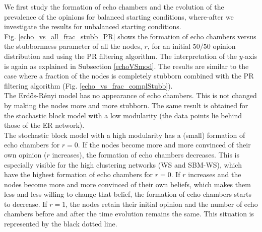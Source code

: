 \documentclass[11 pt , letterpaper , twoside , openright]{book}
\begin{document}
\newline
We first study the formation of echo chambers and the evolution of the prevalence of the opinions for balanced starting conditions, where-after we investigate the results for unbalanced starting conditions.\\
\newline
Fig. \ref{echo_vs_all_frac_stubb_PR} shows the formation of echo chambers versus the stubbornness parameter of all the nodes, $r$, for an initial $50/50$ opinion distribution and using the PR filtering algorithm. The interpretation of the $y$-axis is again as explained in Subsection \ref{echoVSmod}. The results are similar to the case where a fraction of the nodes is completely stubborn combined with the PR filtering algorithm (Fig. \ref{echo_vs_frac_complStubb}).\\
\newline
The Erd\H{o}s-R\'{e}nyi model has no appearance of echo chambers. This is not changed by making the nodes more and more stubborn. The same result is obtained for the stochastic block model with a low modularity (the data points lie behind those of the ER network).\\
\newline
The stochastic block model with a high modularity has a (small) formation of echo chambers for $r=0$. If the nodes become more and more convinced of their own opinion ($r$ increases), the formation of echo chambers decreases. This is especially visible for the high clustering networks (WS and SBM-WS), which have the highest formation of echo chambers for $r=0$. If $r$ increases and the nodes become more and more convinced of their own beliefs, which makes them less and less willing to change that belief, the formation of echo chambers starts to decrease. If $r=1$, the nodes retain their initial opinion and the number of echo chambers before and after the time evolution remains the same. This situation is represented by the black dotted line.
\end{document}
